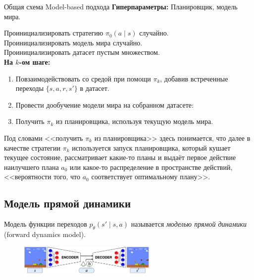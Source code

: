\begin{algorithm}{Общая схема Model-based подхода}
\textbf{Гиперпараметры:} Планировщик, модель мира.

\vspace{0.3cm}
Проинициализировать стратегию $\pi_0(a \mid s)$ случайно. \\
Проинициализировать модель мира случайно. \\
Проинициализировать датасет пустым множеством. \\
\textbf{На $k$-ом шаге:}
\begin{enumerate}
    \item Повзаимодействовать со средой при помощи $\pi_k$, добавив встреченные переходы $\{s, a, r, s'\}$ в датасет.
    \item Провести дообучение модели мира на собранном датасете:
    \item Получить $\pi_k$ из планировщика, используя текущую модель мира.
\end{enumerate}
\end{algorithm}

Под словами <<получить $\pi_k$ из планировщика>> здесь понимается, что далее в качестве стратегии $\pi_k$ используется запуск планировщика, который кушает текущее состояние, рассматривает какие-то планы и выдаёт первое действие наилучшего плана $a_0$ или какое-то распределение в пространстве действий, <<вероятности того, что $a_0$ соответствует оптимальному плану>>.

\subsection{Модель прямой динамики}

\begin{definition}
Модель функции переходов $p_\theta(s' \mid s, a)$ называется \emph{моделью прямой динамики} (forward dynamics model).
\end{definition}

\begin{figure}
\vspace{-0.5cm}
\centering
\includegraphics[width=0.6\textwidth]{Images/MarioVAE.png}
\vspace{-0.5cm}
\end{figure}

